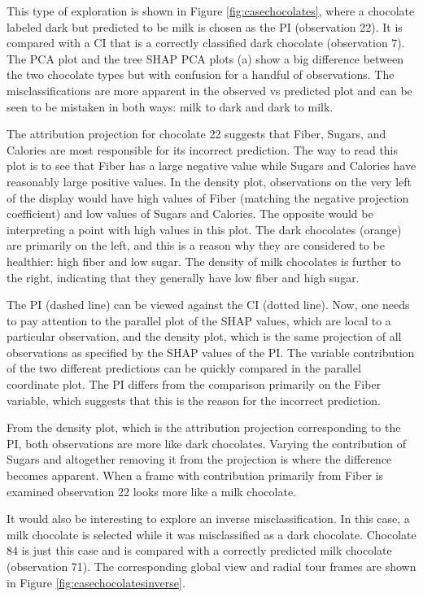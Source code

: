 \documentclass[
]{jss}
\begin{document}
This type of exploration is shown in Figure \ref{fig:casechocolates}, where a chocolate labeled dark but predicted to be milk is chosen as the PI (observation 22). It is compared with a CI that is a correctly classified dark chocolate (observation 7). The PCA plot and the tree SHAP PCA plots (a) show a big difference between the two chocolate types but with confusion for a handful of observations. The misclassifications are more apparent in the observed vs predicted plot and can be seen to be mistaken in both ways: milk to dark and dark to milk.

The attribution projection for chocolate 22 suggests that Fiber, Sugars, and Calories are most responsible for its incorrect prediction. The way to read this plot is to see that Fiber has a large negative value while Sugars and Calories have reasonably large positive values. In the density plot, observations on the very left of the display would have high values of Fiber (matching the negative projection coefficient) and low values of Sugars and Calories. The opposite would be interpreting a point with high values in this plot. The dark chocolates (orange) are primarily on the left, and this is a reason why they are considered to be healthier: high fiber and low sugar. The density of milk chocolates is further to the right, indicating that they generally have low fiber and high sugar.

The PI (dashed line) can be viewed against the CI (dotted line). Now, one needs to pay attention to the parallel plot of the SHAP values, which are local to a particular observation, and the density plot, which is the same projection of all observations as specified by the SHAP values of the PI. The variable contribution of the two different predictions can be quickly compared in the parallel coordinate plot. The PI differs from the comparison primarily on the Fiber variable, which suggests that this is the reason for the incorrect prediction.

From the density plot, which is the attribution projection corresponding to the PI, both observations are more like dark chocolates. Varying the contribution of Sugars and altogether removing it from the projection is where the difference becomes apparent. When a frame with contribution primarily from Fiber is examined observation 22 looks more like a milk chocolate.

It would also be interesting to explore an inverse misclassification. In this case, a milk chocolate is selected while it was misclassified as a dark chocolate. Chocolate 84 is just this case and is compared with a correctly predicted milk chocolate (observation 71). The corresponding global view and radial tour frames are shown in Figure \ref{fig:casechocolatesinverse}.
\end{document}
